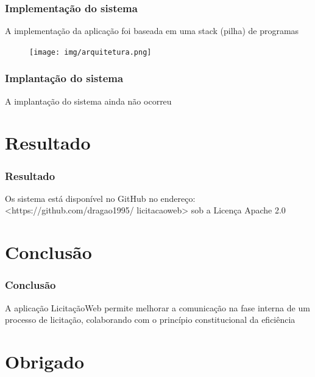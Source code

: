 \documentclass{beamer}
\begin{document}
		\begin{frame}\frametitle{Implementação do sistema}
			A implementação da aplicação foi baseada em uma stack (pilha) de programas
			\begin{figure}[ht]
				\centering
				\texttt{[image: img/arquitetura.png]}
			\end{figure}
		\end{frame}
	
		\begin{frame}\frametitle{Implantação do sistema}
			A implantação do sistema ainda não ocorreu
		\end{frame}
	
	\section{Resultado}
		
		\begin{frame}\frametitle{Resultado}
			
			Os sistema está disponível no GitHub no endereço: <https://github.com/dragao1995/
			licitacaoweb> sob a Licença Apache 2.0
		\end{frame}

	\section{Conclusão}
	
		\begin{frame}\frametitle{Conclusão}
		
			A aplicação LicitaçãoWeb permite melhorar a comunicação na fase interna de um processo de licitação, colaborando com o princípio constitucional da eficiência
		\end{frame}	
	
	\section{Obrigado}
		
\end{document}
